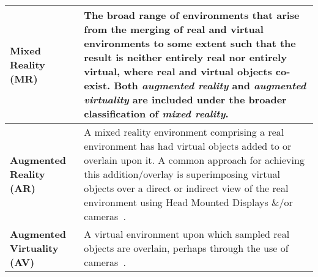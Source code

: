 \begin{center}
\begin{longtable}{| l | p{12cm} |}

\textbf{Mixed Reality (MR)} & The broad range of environments that arise from the merging of real and virtual environments to some extent such that the result is neither entirely real nor entirely virtual, where real and virtual objects co-exist. Both \textit{augmented reality} and \textit{augmented virtuality} are included under the broader classification of \textit{mixed reality}. \\

\hline
		

\textbf{Augmented Reality (AR)} & A mixed reality environment comprising a real environment has had virtual objects added to or overlain upon it. A common approach for achieving this addition/overlay is superimposing virtual objects over a direct or indirect view of the real environment using Head Mounted Displays \&/or cameras~\cite{Krevelen2010}. \\



\hline


\textbf{Augmented Virtuality (AV)} & A virtual environment upon which sampled real objects are overlain, perhaps through the use of cameras~\cite{caballero:behand}. \\


\hline



\end{longtable}
\end{center}
